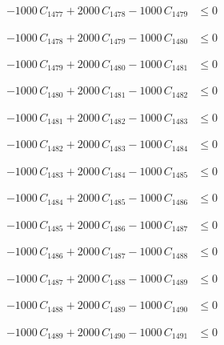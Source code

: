 \documentclass[a4paper,11pt]{article}
\begin{document}
\begin{align}
-1000\,C_{1477} + 2000\,C_{1478} - 1000\,C_{1479} &\leq 0 \nonumber
\end{align}

\begin{align}
-1000\,C_{1478} + 2000\,C_{1479} - 1000\,C_{1480} &\leq 0 \nonumber
\end{align}

\begin{align}
-1000\,C_{1479} + 2000\,C_{1480} - 1000\,C_{1481} &\leq 0 \nonumber
\end{align}

\begin{align}
-1000\,C_{1480} + 2000\,C_{1481} - 1000\,C_{1482} &\leq 0 \nonumber
\end{align}

\begin{align}
-1000\,C_{1481} + 2000\,C_{1482} - 1000\,C_{1483} &\leq 0 \nonumber
\end{align}

\begin{align}
-1000\,C_{1482} + 2000\,C_{1483} - 1000\,C_{1484} &\leq 0 \nonumber
\end{align}

\begin{align}
-1000\,C_{1483} + 2000\,C_{1484} - 1000\,C_{1485} &\leq 0 \nonumber
\end{align}

\begin{align}
-1000\,C_{1484} + 2000\,C_{1485} - 1000\,C_{1486} &\leq 0 \nonumber
\end{align}

\begin{align}
-1000\,C_{1485} + 2000\,C_{1486} - 1000\,C_{1487} &\leq 0 \nonumber
\end{align}

\begin{align}
-1000\,C_{1486} + 2000\,C_{1487} - 1000\,C_{1488} &\leq 0 \nonumber
\end{align}

\begin{align}
-1000\,C_{1487} + 2000\,C_{1488} - 1000\,C_{1489} &\leq 0 \nonumber
\end{align}

\begin{align}
-1000\,C_{1488} + 2000\,C_{1489} - 1000\,C_{1490} &\leq 0 \nonumber
\end{align}

\begin{align}
-1000\,C_{1489} + 2000\,C_{1490} - 1000\,C_{1491} &\leq 0 \nonumber
\end{align}
\end{document}
